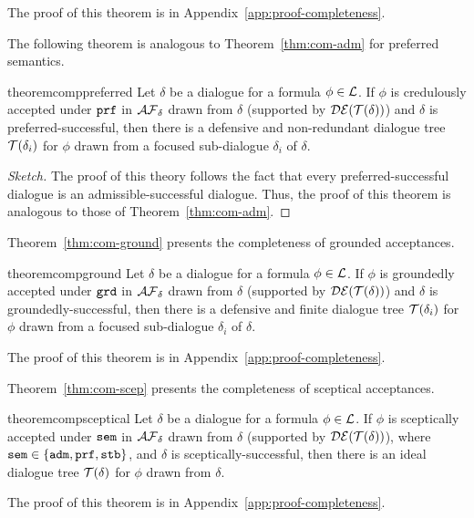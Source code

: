 The proof of this theorem is in Appendix~\ref{app:proof-completeness}.

The following theorem is analogous to Theorem~\ref{thm:com-adm} for preferred semantics.
\begin{restatable} {theorem}{comppreferred}
\label{thm:com-prf}
Let $\delta$ be a dialogue for a formula $\phi \in \mathcal{L}$. If $\phi$ is credulously accepted under $\texttt{\textup{prf}}$ in $\mathcal{AF}_ \delta$ drawn from $\delta$ (supported by $\mathcal{DE}(\mathcal{T}(\delta))$)
and $\delta$ is preferred-successful, then there is a defensive and non-redundant dialogue tree $\mathcal{T}(\delta_i)$ for $\phi$ drawn from a focused sub-dialogue $\delta_i$ of $\delta$.
\end{restatable}

\begin{proof} [Sketch]
The proof of this theory follows the fact that every preferred-successful dialogue is an admissible-successful dialogue. Thus, the proof of this theorem is analogous to those of Theorem~\ref{thm:com-adm}.
\end{proof}
Theorem~\ref{thm:com-ground} presents the completeness of grounded acceptances.
\begin{restatable} {theorem}{compground}
\label{thm:com-ground}
Let $\delta$ be a dialogue for a formula $\phi \in \mathcal{L}$. If $\phi$ is groundedly accepted under $\texttt{\textup{grd}}$ in $\mathcal{AF}_ \delta$ drawn from $\delta$ (supported by $\mathcal{DE}(\mathcal{T}(\delta))$) and $\delta$ is groundedly-successful, then there is a defensive and finite dialogue tree $\mathcal{T}(\delta_i)$ for $\phi$ drawn from a focused sub-dialogue $\delta_i$ of $\delta$.
\end{restatable}

The proof of this theorem is in Appendix~\ref{app:proof-completeness}.

Theorem~\ref{thm:com-scep} presents the completeness of sceptical acceptances.

\begin{restatable} {theorem}{compsceptical}
\label{thm:com-scep}
Let $\delta$ be a dialogue for a formula $\phi \in \mathcal{L}$. If $\phi$ is sceptically accepted under $\texttt{\textup{sem}}$ in $\mathcal{AF}_ \delta$ drawn from $\delta$ (supported by $\mathcal{DE}(\mathcal{T}(\delta))$), where $\texttt{\textup{sem}} \in \{\texttt{\textup{adm}}, \texttt{\textup{prf}}, \texttt{\textup{stb}}\}$, and $\delta$ is sceptically-successful, then there is an ideal dialogue tree $\mathcal{T}(\delta)$ for $\phi$ drawn from $\delta$.
\end{restatable}

The proof of this theorem is in Appendix~\ref{app:proof-completeness}.

